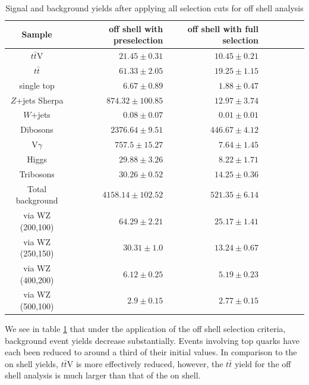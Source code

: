 \begin{table}[H]
\begin{center}
\begin{tabular}{c r r r r r r r}
\toprule
Sample& off shell with preselection& off shell with full selection\\

\midrule
$t\bar{t}$V& $ 21.45 \pm 0.31 $& $ 10.45 \pm 0.21 $\\

$t\bar{t}$& 	 $61.33\pm 2.05$& 	 $19.25\pm 1.15$\\

single top& 	 $6.67\pm 0.89$& 	 $1.88\pm 0.47$\\

$Z$+jets Sherpa& 	 $874.32\pm 100.85$& 	 $12.97\pm 3.74$\\

$W$+jets& 	 $0.08\pm 0.07$& 	 $0.01\pm 0.01$\\

Dibosons& 	 $2376.64\pm 9.51$& 	 $446.67\pm 4.12$\\

V$\gamma$& 	 $757.5\pm 15.27$& 	 $7.64\pm 1.45$\\

Higgs& 	 $29.88\pm 3.26$& 	 $8.22\pm 1.71$\\

Tribosons& 	 $30.26\pm 0.52$& 	 $14.25\pm 0.36$\\

\hline
Total background& 	 $4158.14\pm102.52$& 	 $521.35\pm6.14$\\

\hline\hline
via WZ (200,100)& 	 $64.29\pm 2.21$& 	 $25.17\pm 1.41$\\

via WZ (250,150)& 	 $30.31\pm 1.0$& 	 $13.24\pm 0.67$\\

via WZ (400,200)& 	 $6.12\pm 0.25$& 	 $5.19\pm 0.23$\\

via WZ (500,100)& 	 $2.9\pm 0.15$& 	 $2.77\pm 0.15$\\

\bottomrule
\end{tabular}
\end{center}
\caption{Signal and background yields after applying all selection cuts for off shell analysis}
\label{tab:offShellResults}
\end{table}

We see in table \ref{tab:offShellResults} that under the application of the off shell selection criteria, background event yields decrease substantially.
Events involving top quarks have each been reduced to around a third of their initial values.
In comparison to the on shell yields, $t\bar{t}$V is more effectively reduced, however, the $t\bar{t}$ yield for the off shell analysis is much larger than that of the on shell.


